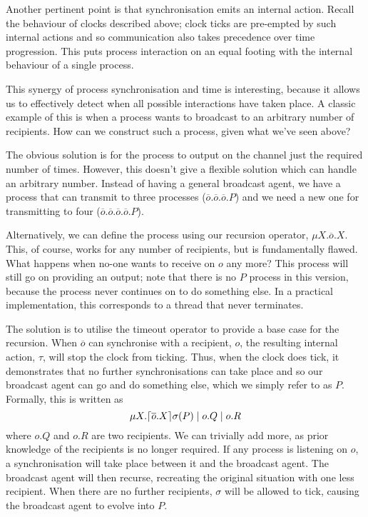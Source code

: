 \documentclass{acm_proc_article-sp}
\begin{document}
Another pertinent point is that synchronisation emits an internal
action.  Recall the behaviour of clocks described above; clock ticks are
pre-empted by such internal actions and so communication also takes
precedence over time progression.  This puts process interaction on an
equal footing with the internal behaviour of a single process.

This synergy of process synchronisation and time is interesting, because
it allows us to effectively detect when all possible interactions have
taken place.  A classic example of this is when a process wants to
broadcast to an arbitrary number of recipients.  How can we construct
such a process, given what we've seen above?

The obvious solution is for the process to output on the channel just
the required number of times.  However, this doesn't give a flexible
solution which can handle an arbitrary number.  Instead of having a
general broadcast agent, we have a process that can transmit to three
processes ($\overline{o}.\overline{o}.\overline{o}.P$) and we need a new
one for transmitting to four
($\overline{o}.\overline{o}.\overline{o}.\overline{o}.P$).

Alternatively, we can define the process using our recursion operator,
$\mu X.\overline{o}.X$.  This, of course, works for any number of
recipients, but is fundamentally flawed.  What happens when no-one wants
to receive on $o$ any more?  This process will still go on providing an
output; note that there is no $P$ process in this version, because the
process never continues on to do something else.  In a practical
implementation, this corresponds to a thread that never terminates.

The solution is to utilise the timeout operator to provide a base case
for the recursion.  When $\overline{o}$ can synchronise with a
recipient, $o$, the resulting internal action, $\tau$, will stop the
clock from ticking.  Thus, when the clock does tick, it demonstrates
that no further synchronisations can take place and so our broadcast
agent can go and do something else, which we simply refer to as $P$.
Formally, this is written as
\begin{displaymath} 
\mu X.\lceil{\overline{o}.X}\rceil {\sigma} ({P}) \mid o.Q \mid o.R
\end{displaymath}
where $o.Q$ and $o.R$ are two recipients.  We can trivially add more, as
prior knowledge of the recipients is no longer required.  If any process
is listening on $o$, a synchronisation will take place between it and
the broadcast agent.  The broadcast agent will then recurse, recreating
the original situation with one less recipient.  When there are no
further recipients, $\sigma$ will be allowed to tick, causing the
broadcast agent to evolve into $P$.
\end{document}
